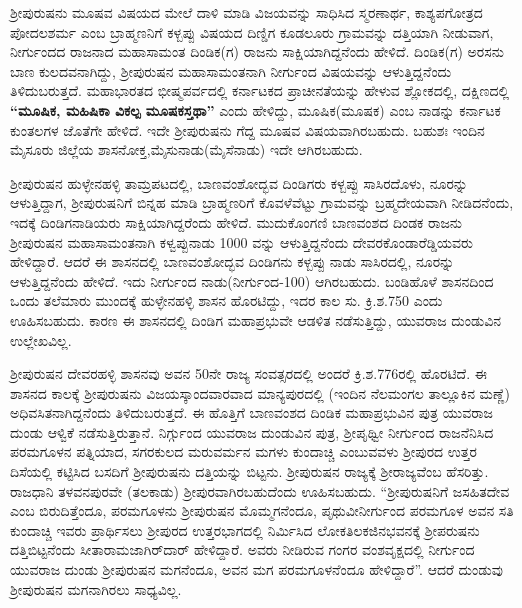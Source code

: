ಶ‍್ರೀಪುರುಷನು ಮೂಷವ ವಿಷಯದ ಮೇಲೆ ದಾಳಿ ಮಾಡಿ ವಿಜಯವನ್ನು ಸಾಧಿಸಿದ ಸ್ಮರಣಾರ್ಥ, ಕಾಶ್ಯಪಗೋತ್ರದ ಪೋದಲಶರ್ಮ ಎಂಬ ಬ್ರಾಹ್ಮಣನಿಗೆ ಕಳ್ಬಪ್ಪು ವಿಷಯದ ದಿಣ್ಡಿಗ ಕೂಡಲೂರು ಗ್ರಾಮವನ್ನು ದತ್ತಿಯಾಗಿ ನೀಡುವಾಗ, ನೀರ್ಗುಂದದ ರಾಜನಾದ ಮಹಾಸಾಮಂತ ದಿಂಡಿಕ(ಗ) ರಾಜನು ಸಾಕ್ಷಿಯಾಗಿದ್ದನೆಂದು ಹೇಳಿದೆ. ದಿಂಡಿಕ(ಗ) ಅರಸನು ಬಾಣ ಕುಲದವ\-ನಾಗಿದ್ದು, ಶ‍್ರೀಪುರುಷನ ಮಹಾಸಾಮಂತನಾಗಿ ನೀರ್ಗುಂದ ವಿಷಯವನ್ನು ಆಳುತ್ತಿದ್ದನೆಂದು ತಿಳಿದುಬರುತ್ತದೆ. ಮಹಾಭಾರತದ ಭೀಷ್ಮಪರ್ವದಲ್ಲಿ ಕರ್ನಾಟಕದ ಪ್ರಾಚೀನತೆಯನ್ನು ಹೇಳುವ ಶ್ಲೋಕದಲ್ಲಿ, ದಕ್ಷಿಣದಲ್ಲಿ\textbf{ “ಮೂಷಿಕ, ಮಹಿಷಿಕಾ ವಿಕಲ್ಪ ಮೂಷಕಸ್ತಥಾ” }ಎಂದು ಹೇಳಿದ್ದು, ಮೂಷಿಕ(ಮೂಷಕ) ಎಂಬ ನಾಡನ್ನು ಕರ್ನಾಟಕ ಕುಂತಲಗಳ ಜೊತೆಗೇ ಹೇಳಿದೆ. ಇದೇ ಶ‍್ರೀಪುರುಷನು ಗೆದ್ದ ಮೂಷವ ವಿಷಯವಾಗಿರಬಹುದು. ಬಹುಶಃ ಇಂದಿನ ಮೈಸೂರು ಜಿಲ್ಲೆಯ ಶಾಸನೋಕ್ತ,\break ಮೈಸುನಾಡು(ಮೈಸೆನಾಡು) ಇದೇ ಆಗಿರಬಹುದು.

ಶ‍್ರೀಪುರುಷನ ಹುಳ್ಳೇನಹಳ್ಳಿ ತಾಮ್ರಪಟದಲ್ಲಿ, ಬಾಣವಂಶೋದ್ಭವ ದಿಂಡಿಗರು ಕಳ್ಬಪ್ಪು ಸಾಸಿರದೊಳು, ನೂರನ್ನು ಆಳುತ್ತಿದ್ದಾಗ, ಶ‍್ರೀಪುರುಷನಿಗೆ ಬಿನ್ನಹ ಮಾಡಿ ಬ್ರಾಹ್ಮಣರಿಗೆ ಕೊವಳೆವೆಟ್ಟು ಗ್ರಾಮವನ್ನು ಬ್ರಹ್ಮದೇಯವಾಗಿ ನೀಡಿದನೆಂದು, ಇದಕ್ಕೆ ದಿಂಡಿಗನಾಡಿಯರು ಸಾಕ್ಷಿಯಾಗಿದ್ದರೆಂದು ಹೇಳಿದೆ. ಮುದುಕೊಂಗಣಿ ಬಾಣವಂಶದ ದಿಂಡಕ ರಾಜನು ಶ‍್ರೀಪುರುಷನ ಮಹಾಸಾಮಂತನಾಗಿ ಕಳ್ವಪ್ಪುನಾಡು 1000 ವನ್ನು ಆಳುತ್ತಿದ್ದನೆಂದು ದೇವರಕೊಂಡಾರೆಡ್ಡಿಯವರು ಹೇಳಿದ್ದಾರೆ. ಆದರೆ ಈ ಶಾಸನದಲ್ಲಿ ಬಾಣವಂಶೋದ್ಭವ ದಿಂಡಿಗನು ಕಳ್ಬಪ್ಪು ನಾಡು ಸಾಸಿರದಲ್ಲಿ, ನೂರನ್ನು ಆಳುತ್ತಿದ್ದನೆಂದು ಹೇಳಿದೆ. ಇದು ನೀರ್ಗುಂದ ನಾಡು(ನೀರ್ಗುಂದ-100) ಆಗಿರಬಹುದು. ಬಂಡಿಹೊಳೆ ಶಾಸನದಿಂದ ಒಂದು ತಲೆಮಾರು ಮುಂದಕ್ಕೆ ಹುಳ್ಳೇನಹಳ್ಳಿ ಶಾಸನ ಹೊರಟಿದ್ದು, ಇದರ ಕಾಲ ಸು. ಕ್ರಿ.ಶ.750 ಎಂದು ಊಹಿಸಬಹುದು. ಕಾರಣ ಈ ಶಾಸನದಲ್ಲಿ ದಿಂಡಿಗ ಮಹಾಪ್ರಭುವೇ ಆಡಳಿತ ನಡೆಸುತ್ತಿದ್ದು, ಯುವರಾಜ ದುಂಡುವಿನ ಉಲ್ಲೇಖವಿಲ್ಲ.

\newpage

ಶ‍್ರೀಪುರುಷನ ದೇವರಹಳ್ಳಿ ಶಾಸನವು ಅವನ 50ನೇ ರಾಜ್ಯ ಸಂವತ್ಸರದಲ್ಲಿ ಅಂದರೆ ಕ್ರಿ.ಶ.776ರಲ್ಲಿ ಹೊರಟಿದೆ. ಈ ಶಾಸನದ ಕಾಲಕ್ಕೆ ಶ‍್ರೀಪುರುಷನು ವಿಜಯಸ್ಕಾಂದವಾರವಾದ ಮಾನ್ಯಪುರದಲ್ಲಿ (ಇಂದಿನ ನೆಲಮಂಗಲ ತಾಲ್ಲೂಕಿನ ಮಣ್ಣೆ) ಅಧಿವಸಿತನಾಗಿದ್ದನೆಂದು ತಿಳಿದುಬರುತ್ತದೆ. ಈ ಹೊತ್ತಿಗೆ ಬಾಣವಂಶದ ದಿಂಡಿಕ ಮಹಾಪ್ರಭುವಿನ ಪುತ್ರ ಯುವರಾಜ ದುಂಡು ಆಳ್ವಿಕೆ ನಡೆಸುತ್ತಿರುತ್ತಾನೆ. ನಿರ್ಗ್ಗುಂದ ಯುವರಾಜ ದುಂಡುವಿನ ಪುತ್ರ, ಶ‍್ರೀಪೃಥ್ವೀ ನೀರ್ಗುಂದ ರಾಜನೆನಿಸಿದ ಪರಮಗೂಳನ ಪತ್ನಿಯಾದ, ಸಗರಕುಲದ ಮರುವರ್ಮನ ಮಗಳು ಕುಂದಾಚ್ಚಿ ಎಂಬುವವಳು ಶ‍್ರೀಪುರದ ಉತ್ತರ ದಿಸೆಯಲ್ಲಿ ಕಟ್ಟಿಸಿದ ಬಸದಿಗೆ ಶ‍್ರೀಪುರುಷನು ದತ್ತಿಯನ್ನು ಬಿಟ್ಟನು. ಶ‍್ರೀಪುರುಷನ ರಾಜ್ಯಕ್ಕೆ ಶ‍್ರೀರಾಜ್ಯವೆಂಬ ಹೆಸರಿತ್ತು. ರಾಜಧಾನಿ ತಳವನಪುರವೇ (ತಲಕಾಡು) ಶ‍್ರೀಪುರವಾಗಿರಬಹುದೆಂದು ಊಹಿಸಬಹುದು. “ಶ‍್ರೀಪುರುಷನಿಗೆ ಜಸಹಿತದೇವ ಎಂಬ ಬಿರುದಿತ್ತೆಂದೂ, ಪರಮಗೂಳನು ಶ‍್ರೀಪುರುಷನ ಮೊಮ್ಮಗನೆಂದೂ, ಪೃಥುವೀನೀರ್ಗುಂದ ಪರಮಗೂಳ ಅವನ ಸತಿ ಕುಂದಾಚ್ಚಿ ಇವರು ಪ್ರಾರ್ಥಿಸಲು ಶ‍್ರೀಪುರದ ಉತ್ತರಭಾಗದಲ್ಲಿ ನಿರ್ಮಿಸಿದ ಲೋಕತಿಲಕಜಿನಭವನಕ್ಕೆ ಶ‍್ರೀಪರುಷನು ದತ್ತಿಬಿಟ್ಟನೆಂದು ಸೀತಾರಾಮ\-ಜಾಗಿರ್​ದಾರ್​ ಹೇಳಿದ್ದಾರೆ. ಅವರು ನೀಡಿರುವ ಗಂಗರ ವಂಶವೃಕ್ಷದಲ್ಲಿ ನೀರ್ಗುಂದ ಯುವರಾಜ ದುಂಡು ಶ‍್ರೀಪುರುಷನ ಮಗನೆಂದೂ, ಅವನ ಮಗ ಪರಮಗೂಳನೆಂದೂ ಹೇಳಿದ್ದಾರೆ”. ಆದರೆ ದುಂಡುವು ಶ‍್ರೀಪುರುಷನ ಮಗನಾಗಿರಲು ಸಾಧ್ಯವಿಲ್ಲ.

